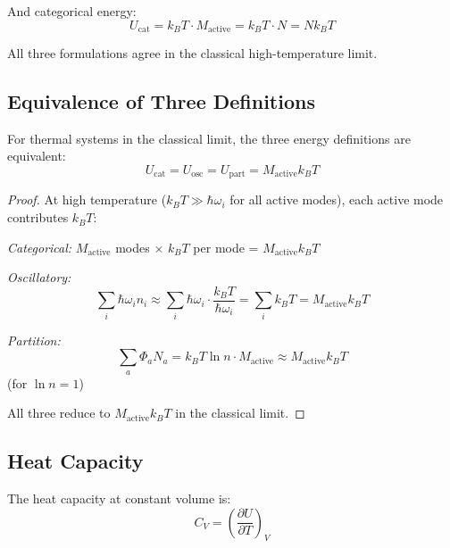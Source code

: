 And categorical energy:
\begin{equation}
U_{\text{cat}} = k_B T \cdot M_{\text{active}} = k_B T \cdot N = N k_B T
\end{equation}

All three formulations agree in the classical high-temperature limit.

\subsection{Equivalence of Three Definitions}

\begin{theorem}
\label{thm:energy_equivalence}
For thermal systems in the classical limit, the three energy definitions are equivalent:
\begin{equation}
U_{\text{cat}} = U_{\text{osc}} = U_{\text{part}} = M_{\text{active}} k_B T
\end{equation}
\end{theorem}

\begin{proof}
At high temperature ($k_B T \gg \hbar\omega_i$ for all active modes), each active mode contributes $k_B T$:

\textit{Categorical:} $M_{\text{active}}$ modes $\times$ $k_B T$ per mode = $M_{\text{active}} k_B T$

\textit{Oscillatory:} 
\begin{equation}
\sum_i \hbar\omega_i n_i \approx \sum_i \hbar\omega_i \cdot \frac{k_B T}{\hbar\omega_i} = \sum_i k_B T = M_{\text{active}} k_B T
\end{equation}

\textit{Partition:} 
\begin{equation}
\sum_a \Phi_a N_a = k_B T \ln n \cdot M_{\text{active}} \approx M_{\text{active}} k_B T
\end{equation}
(for $\ln n = 1$)

All three reduce to $M_{\text{active}} k_B T$ in the classical limit.
\end{proof}

\subsection{Heat Capacity}

The heat capacity at constant volume is:
\begin{equation}
C_V = \left(\frac{\partial U}{\partial T}\right)_V
\end{equation}

